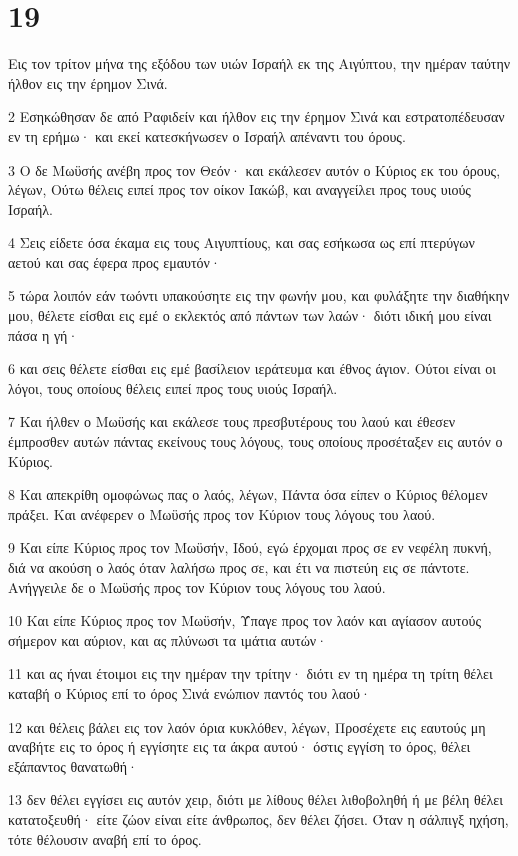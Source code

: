 \chapter{19}

\par Εις τον τρίτον μήνα της εξόδου των υιών Ισραήλ εκ της Αιγύπτου, την ημέραν ταύτην ήλθον εις την έρημον Σινά.
\par 2 Εσηκώθησαν δε από Ραφιδείν και ήλθον εις την έρημον Σινά και εστρατοπέδευσαν εν τη ερήμω· και εκεί κατεσκήνωσεν ο Ισραήλ απέναντι του όρους.
\par 3 Ο δε Μωϋσής ανέβη προς τον Θεόν· και εκάλεσεν αυτόν ο Κύριος εκ του όρους, λέγων, Ούτω θέλεις ειπεί προς τον οίκον Ιακώβ, και αναγγείλει προς τους υιούς Ισραήλ.
\par 4 Σεις είδετε όσα έκαμα εις τους Αιγυπτίους, και σας εσήκωσα ως επί πτερύγων αετού και σας έφερα προς εμαυτόν·
\par 5 τώρα λοιπόν εάν τωόντι υπακούσητε εις την φωνήν μου, και φυλάξητε την διαθήκην μου, θέλετε είσθαι εις εμέ ο εκλεκτός από πάντων των λαών· διότι ιδική μου είναι πάσα η γή·
\par 6 και σεις θέλετε είσθαι εις εμέ βασίλειον ιεράτευμα και έθνος άγιον. Ούτοι είναι οι λόγοι, τους οποίους θέλεις ειπεί προς τους υιούς Ισραήλ.
\par 7 Και ήλθεν ο Μωϋσής και εκάλεσε τους πρεσβυτέρους του λαού και έθεσεν έμπροσθεν αυτών πάντας εκείνους τους λόγους, τους οποίους προσέταξεν εις αυτόν ο Κύριος.
\par 8 Και απεκρίθη ομοφώνως πας ο λαός, λέγων, Πάντα όσα είπεν ο Κύριος θέλομεν πράξει. Και ανέφερεν ο Μωϋσής προς τον Κύριον τους λόγους του λαού.
\par 9 Και είπε Κύριος προς τον Μωϋσήν, Ιδού, εγώ έρχομαι προς σε εν νεφέλη πυκνή, διά να ακούση ο λαός όταν λαλήσω προς σε, και έτι να πιστεύη εις σε πάντοτε. Ανήγγειλε δε ο Μωϋσής προς τον Κύριον τους λόγους του λαού.
\par 10 Και είπε Κύριος προς τον Μωϋσήν, Ύπαγε προς τον λαόν και αγίασον αυτούς σήμερον και αύριον, και ας πλύνωσι τα ιμάτια αυτών·
\par 11 και ας ήναι έτοιμοι εις την ημέραν την τρίτην· διότι εν τη ημέρα τη τρίτη θέλει καταβή ο Κύριος επί το όρος Σινά ενώπιον παντός του λαού·
\par 12 και θέλεις βάλει εις τον λαόν όρια κυκλόθεν, λέγων, Προσέχετε εις εαυτούς μη αναβήτε εις το όρος ή εγγίσητε εις τα άκρα αυτού· όστις εγγίση το όρος, θέλει εξάπαντος θανατωθή·
\par 13 δεν θέλει εγγίσει εις αυτόν χειρ, διότι με λίθους θέλει λιθοβοληθή ή με βέλη θέλει κατατοξευθή· είτε ζώον είναι είτε άνθρωπος, δεν θέλει ζήσει. Όταν η σάλπιγξ ηχήση, τότε θέλουσιν αναβή επί το όρος.
